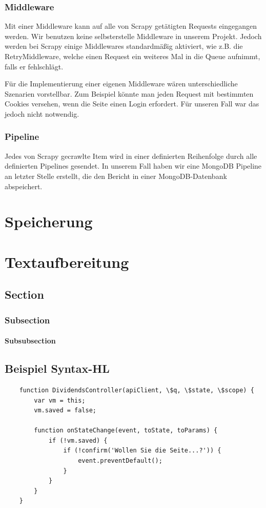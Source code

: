 \documentclass[chapterprefix=false, 12pt, a4paper, oneside, parskip=half, listof=totoc, bibliography=totoc, numbers=noendperiod]{scrbook}
\begin{document}
    \subsection{Middleware}

    Mit einer Middleware kann auf alle von Scrapy getätigten Requests eingegangen werden. Wir benutzen keine selbsterstelle
    Middleware in unserem Projekt. Jedoch werden bei Scrapy einige Middlewares standardmäßig aktiviert, wie z.B.
    die RetryMiddleware, welche einen Request ein weiteres Mal in die Queue aufnimmt, falls er fehlschlägt.

    Für die Implementierung einer eigenen Middleware wären unterschiedliche Szenarien vorstellbar. Zum Beispiel könnte man
    jeden Request mit bestimmten Cookies versehen, wenn die Seite einen Login erfordert. Für unseren Fall war das jedoch nicht
    notwendig.

    \subsection{Pipeline}

    Jedes von Scrapy gecrawlte Item wird in einer definierten Reihenfolge durch alle definierten Pipelines gesendet.
    In unserem Fall haben wir eine MongoDB Pipeline an letzter Stelle erstellt, die den Bericht in einer MongoDB-Datenbank abspeichert.


	\chapter{Speicherung}
	\chapter{Textaufbereitung}
	\section{Section}
	\subsection{Subsection}
	\subsubsection{Subsubsection}

    \section{Beispiel Syntax-HL}
    \begin{verbatim}
    function DividendsController(apiClient, \$q, \$state, \$scope) {
        var vm = this;
        vm.saved = false;

        function onStateChange(event, toState, toParams) {
            if (!vm.saved) {
                if (!confirm('Wollen Sie die Seite...?')) {
                    event.preventDefault();
                }
            }
        }
    }
    \end{verbatim}
\end{document}
